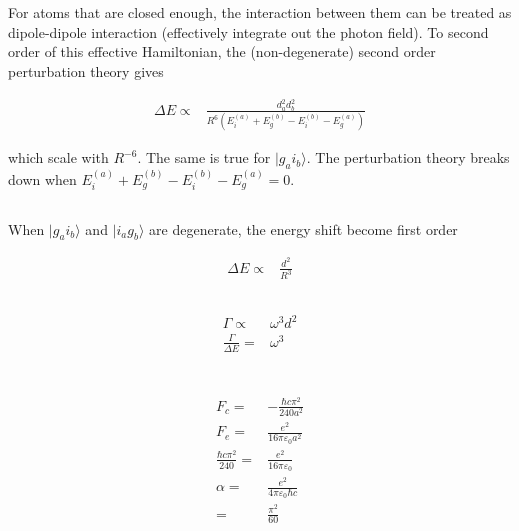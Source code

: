 \documentclass[10pt,fleqn]{article}
\newcommand{\eqar}[1]
{
  \begin{align*}
    #1
  \end{align*}
}
\newcommand{\paren}[1]{{\left({#1}\right)}}
\begin{document}
\section{}
\subsection{}
For atoms that are closed enough, the interaction between them can be treated as dipole-dipole interaction (effectively integrate out the photon field). To second order of this effective Hamiltonian, the (non-degenerate) second order perturbation theory gives
\eqar{
  \Delta E\propto&\frac{d_a^2d_b^2}{R^6\paren{E_i^{(a)}+E_g^{(b)}-E_i^{(b)}-E_g^{(a)}}}
}
which scale with $R^{-6}$. The same is true for $|g_ai_b\rangle$. The perturbation theory breaks down when $E_i^{(a)}+E_g^{(b)}-E_i^{(b)}-E_g^{(a)}=0$.
\subsection{}
When $|g_ai_b\rangle$ and $|i_ag_b\rangle$ are degenerate, the energy shift become first order
\eqar{
  \Delta E\propto&\frac{d^2}{R^3}
}
\subsection{}
\eqar{
  \Gamma\propto&\omega^3d^2\\
  \frac{\Gamma}{\Delta E}=&\omega^3
}

\section{}
\eqar{
  F_c=&-\frac{\hbar c\pi^2}{240a^2}\\
  F_e=&\frac{e^2}{16\pi\varepsilon_0 a^2}\\
  \frac{\hbar c\pi^2}{240}=&\frac{e^2}{16\pi\varepsilon_0}\\
  \alpha=&\frac{e^2}{4\pi\varepsilon_0\hbar c}\\
  =&\frac{\pi^2}{60}
}

\section{}
\end{document}

